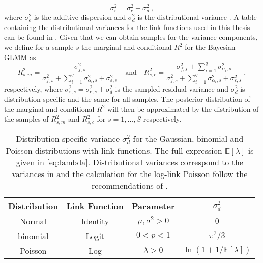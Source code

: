 \begin{equation}
    \sigma_{\varepsilon}^2 = \sigma^2_e + \sigma^2_d \ ,
\end{equation}
where $\sigma^2_e$ is the additive dispersion and $\sigma^2_d$ is the distributional variance \citep{nakagawa2013general}. A table containing the distributional variances for the link functions used in this thesis can be found in . Given that we can obtain samples for the variance components, we define for a sample $s$ the marginal and conditional $R^2$ for the Bayesian GLMM as
\begin{equation}
    \label{eq:R2_Bayes_GLMM}
    R^2_{s, m} = \frac{\sigma_{f, s}^2}{\sigma_{f, s}^2 + \sum_{i=1}^q \sigma_{\alpha_i, s}^2 + \sigma_{\varepsilon, s}^2} \quad \text{and} \quad R^2_{s, c} = \frac{\sigma_{f, s}^2 + \sum_{i=1}^q \sigma_{\alpha_i, s}^2}{\sigma_{f, s}^2 + \sum_{i=1}^q \sigma_{\alpha_i, s}^2 + \sigma_{\varepsilon, s}^2} \ ,
\end{equation}
respectively, where $\sigma_{\varepsilon, s}^2 = \sigma^2_{e, s} + \sigma^2_d$ is the sampled residual variance and $\sigma^2_d$ is distribution specific and the same for all samples. The posterior distribution of the marginal and conditional $R^2$ will then be approximated by the distribution of the samples of $R^2_{s, m}$ and $R^2_{s, c}$ for $s=1, ..., S$ respectively.

\begin{table}[ht]
    \centering
    \begin{tabular}{|c|c|c|c|}
    \hline
    \textbf{Distribution} &  \textbf{Link Function} & \textbf{Parameter} & \(\sigma^2_d\) \\
    \hline
    Normal & Identity & $\mu, \sigma^2 > 0$ & $0$ \\
    \hline
    binomial & Logit & $0<p<1$ & \(\pi^2/3\) \\
    \hline
    Poisson & Log & $\lambda>0$ & $\ln(1 + 1/\mathbb{E}[\lambda])$ \\%
    \hline
    \end{tabular}
    \caption[Distribution-specific variance \(\sigma^2_d\) for the Gaussian, binomial and Poisson distributions]{Distribution-specific variance \(\sigma^2_d\) for the Gaussian, binomial and Poisson distributions with link functions. The full expression $\mathbb{E}[\lambda]$ is given in \eqref{eq:lambda}. Distributional variances correspond to the variances in \citet{nakagawa2013general} and the calculation for the log-link Poisson follow the recommendations of \citet{nakagawa2017}.}
    \label{table:1}
\end{table}


